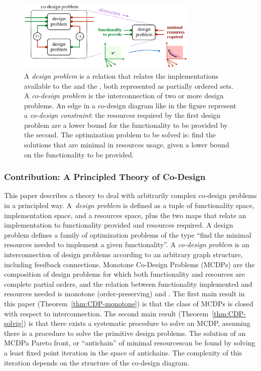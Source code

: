 \begin{figure}[t]
\begin{centering}
\includegraphics[width=8.6cm]{gmcdptro_intro}
\par\end{centering}
\caption{\label{fig:intro}A \emph{design problem }is a relation that relates
the implementations available to the 
 and the , both represented as partially ordered
sets. A\emph{ co-design problem }is the interconnection of two or
more design problems. An edge in a co-design diagram like in the figure
represent a \emph{co-design constraint}: the resources required by
the first design problem are a lower bound for the functionality to
be provided by the second. The optimization problem to be solved is:
find the solutions that are minimal in resources usage, given a lower
bound on the functionality to be provided. }
\end{figure}


\subsubsection*{Contribution: A Principled Theory of Co-Design}

This paper describes a theory to deal with arbitrarily complex co-design
problems in a principled way. A~\emph{design problem} is defined
as a tuple of functionality space, implementation space, and a resources
space, plus the two maps that relate an implementation to functionality
provided and resources required. A design problem defines a family
of optimization problems of the type ``find the minimal resources
needed to implement a given functionality''. A \emph{co-design problem}
is an interconnection of design problems according to an arbitrary
graph structure, including feedback connections. Monotone Co-Design
Problems (MCDPs) are the composition of design problems for which
both functionality and resources are complete partial orders, and
the relation between functionality implemented and resources needed
is monotone (order-preserving) and \scottcontinuous. The first main
result in this paper (Theorem~\vref{thm:CDP-monotone}) is that the
class of MCDPs is closed with respect to interconnection. The second
main result (Theorem~\vref{thm:CDP-solvig}) is that there exists
a systematic procedure to solve an MCDP, assuming there is a procedure
to solve the primitive design problems. The solution of an MCDP\textemdash a
Pareto front, or ``antichain'' of minimal resources\textemdash can
be found by solving a least fixed point iteration in the space of
antichains. The complexity of this iteration depends on the structure
of the co-design diagram.


